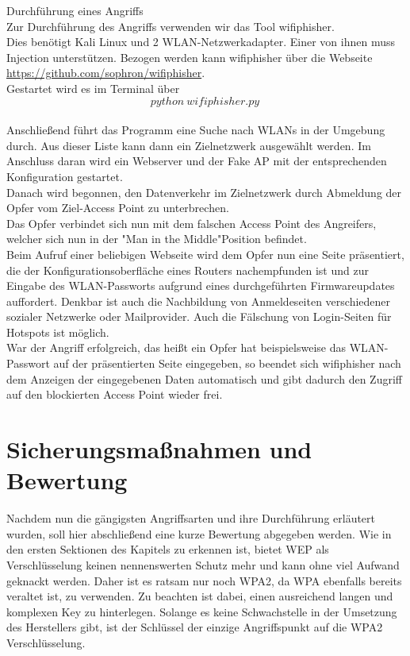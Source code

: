 {\Large Durchführung eines Angriffs}\\

Zur Durchführung des Angriffs verwenden wir das Tool wifiphisher.\\ 

Dies benötigt Kali Linux und 2 WLAN-Netzwerkadapter. Einer von ihnen muss Injection unterstützen. Bezogen werden kann wifiphisher über die Webseite \url{https://github.com/sophron/wifiphisher}. \\

Gestartet wird es im Terminal über 
$$python~wifiphisher.py~$$\\

Anschließend führt das Programm eine Suche nach WLANs in der Umgebung durch. Aus dieser Liste kann dann ein  Zielnetzwerk ausgewählt werden. Im Anschluss daran wird ein Webserver und der Fake AP mit der entsprechenden Konfiguration gestartet. \\

Danach wird begonnen, den Datenverkehr im Zielnetzwerk durch Abmeldung der Opfer vom Ziel-Access Point zu unterbrechen. \\

Das Opfer verbindet sich nun mit dem falschen Access Point des Angreifers, welcher sich nun in der "Man in the Middle"\text{-}Position befindet. \\

Beim Aufruf einer beliebigen Webseite wird dem Opfer nun eine Seite präsentiert, die der Konfigurationsoberfläche eines Routers nachempfunden ist und zur Eingabe des WLAN-Passworts aufgrund eines durchgeführten Firmwareupdates auffordert. Denkbar ist auch die Nachbildung von Anmeldeseiten verschiedener sozialer Netzwerke oder Mailprovider. Auch die Fälschung von Login-Seiten für Hotspots ist möglich. \\

War der Angriff erfolgreich, das heißt ein Opfer hat beispielsweise das WLAN-Passwort auf der präsentierten Seite eingegeben, so beendet sich wifiphisher nach dem Anzeigen der eingegebenen Daten automatisch und gibt dadurch den Zugriff auf den blockierten Access Point wieder frei.

\section{Sicherungsmaßnahmen und Bewertung}

Nachdem nun die gängigsten Angriffsarten und ihre Durchführung erläutert wurden, soll hier abschließend eine kurze Bewertung abgegeben werden. Wie in den ersten Sektionen des Kapitels zu erkennen ist, bietet WEP als Verschlüsselung keinen nennenswerten Schutz mehr und kann ohne viel Aufwand geknackt werden. Daher ist es ratsam nur noch WPA2, da WPA ebenfalls bereits veraltet ist, zu verwenden. Zu beachten ist dabei, einen ausreichend langen und komplexen Key zu hinterlegen. Solange es keine Schwachstelle in der Umsetzung des Herstellers gibt, ist der Schlüssel der einzige Angriffspunkt auf die WPA2 Verschlüsselung. \\

